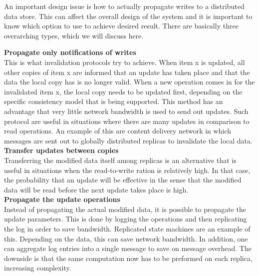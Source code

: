 \documentclass[9pt]{extarticle} %
\begin{document}
%
%
\begin{minipage}[t]{.61\linewidth} %
\vspace{-0.4cm}
\hypertarget{firstnews}{}

An important design issue is how to actually propagate writes to a distributed data store. This can affect the overall design of the system and it is important to know which option to use to achieve desired result. There are basically three overarching types, which we will discuss here.

\textbf{Propagate only notifications of writes} \\
This is what invalidation protocols try to achieve. When item x is updated, all other copies of item x are informed that an update has taken place and that the data the local copy has is no longer valid. When a new operation comes in for the invalidated item x, the local copy needs to be updated first, depending on the specific consistency model that is being supported. This method has an advantage that very little network bandwidth is used to send out updates. Such protocol are useful in situations where there are many updates in comparison to read operations. An example of this are content delivery network in which messages are sent out to globally distributed replicas to invalidate the local data.
\\
\textbf{Transfer updates between copies} \\
Transferring the modified data itself among replicas is an alternative that is useful in situations when the read-to-write ration is relatively high. In that case, the probability that an update will be effective in the sense that the modified data will be read before the next update takes place is high.  
\\
\textbf{Propagate the update operations} \\
Instead of propagating the actual modified data, it is possible to propagate the update parameters. This is done by logging the operations and then replicating the log in order to save bandwidth. Replicated state machines are an example of this. Depending on the data, this can save network bandwidth. In addition, one can aggregate log entries into a single message to save on message overhead. The downside is that the same computation now has to be preformed on each replica, increasing complexity.    


\end{minipage}
\end{document}
